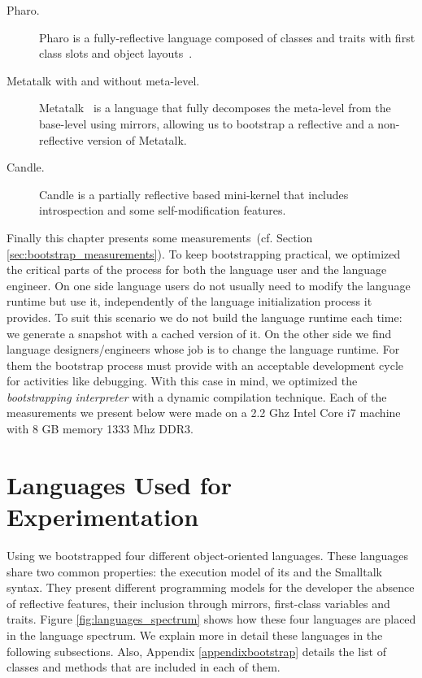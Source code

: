 \begin{description}
\item[Pharo.] Pharo is a fully-reflective language composed of classes and traits with first class slots and object layouts~\cite{Verw11a}.
\item[Metatalk with and without meta-level.] Metatalk~\cite{Papo11a} is a language that fully decomposes the meta-level from the base-level using mirrors, allowing us to bootstrap a reflective and a non-reflective version of Metatalk.
\item[Candle.] Candle is a partially reflective  based mini-kernel that includes introspection and some self-modification features.
\end{description}

Finally this chapter presents some measurements~(cf. Section \ref{sec:bootstrap_measurements}). To keep bootstrapping practical, we optimized the critical parts of the process for both the language user and the language engineer. On one side language users do not usually need to modify the language runtime but use it, independently of the language initialization process it provides. To suit this scenario we do not build the language runtime each time: we generate a snapshot with a cached version of it. On the other side we find language designers/engineers whose job is to change the language runtime. For them the bootstrap process must provide with an acceptable development cycle for activities like debugging. With this case in mind, we optimized the \emph{bootstrapping interpreter} with a dynamic compilation technique. Each of the measurements we present below were made on a 2.2 Ghz Intel Core i7 machine with 8 GB memory 1333 Mhz DDR3.

\section{Languages Used for Experimentation}\label{sec:bootstrap_case_studies}

Using \Vtt we bootstrapped four different object-oriented languages. These languages share two common properties: the execution model of its \VM and the Smalltalk syntax. They present different programming models for the developer \eg the absence of reflective features, their inclusion through mirrors, first-class variables and traits.
Figure \ref{fig:languages_spectrum} shows how these four languages are placed in the language spectrum. We explain more in detail these languages in the following subsections. Also, Appendix \ref{appendixbootstrap} details the list of classes and methods that are included in each of them.%

